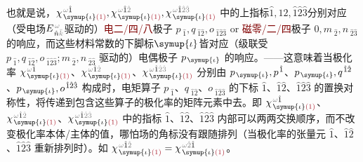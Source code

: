 也就是说，$\chi^{\;\! \mathcolor{gray}{\omega} \hat{1}}_{\;\! \symup{\iota} \textcolor{Maroon}{(1)}},\chi^{\;\! \mathcolor{gray}{\omega} \hat{1} \mathcolor{gray}{\hat{2}}}_{\;\! \symup{\iota} \textcolor{Maroon}{(1)}},\chi^{\;\! \mathcolor{gray}{\omega} \hat{1} \mathcolor{gray}{\hat{2} \hat{3}}}_{\;\! \symup{\iota} \textcolor{Maroon}{(1)}}$ 中的上指标$\hat{1},\hat{1} \hat{2},\hat{1} \hat{2} \hat{3}$分别对应（受电场$E^{\;\!\mathcolor{gray}{\omega}}_{\;\! \hat{n} \mathcolor{gray}{\bar{k}}}$驱动的）\textcolor{Maroon}{电二/四/八}极子 $p_{\;\! \hat{1}}, q_{\;\! \hat{1} \hat{2}}, o_{\;\! \hat{1} \hat{2} \hat{3}}$ or \textcolor{Maroon}{磁零/二/四}极子 $0, m_{\;\! \hat{2}}, n_{\;\! \hat{2} \hat{3}}$ 的响应，而这些材料常数的下脚标$\symup{\iota}$皆对应（级联受 $p_{\;\! \hat{1}}, q_{\;\! \hat{1} \hat{2}}, o_{\;\! \hat{1} \hat{2} \hat{3}}; m_{\;\! \hat{2}}, n_{\;\! \hat{2} \hat{3}}$ 驱动的）电偶极子 $p_{\;\! \symup{\iota}}$ 的响应。——这意味着当极化率 $\chi^{\;\! \mathcolor{gray}{\omega} \hat{1}}_{\;\! \symup{\iota} \textcolor{Maroon}{(1)}}$、$\chi^{\;\! \mathcolor{gray}{\omega} \hat{1} \mathcolor{gray}{\hat{2}}}_{\;\! \symup{\iota} \textcolor{Maroon}{(1)}}$、$\chi^{\;\! \mathcolor{gray}{\omega} \hat{1} \mathcolor{gray}{\hat{2} \hat{3}}}_{\;\! \symup{\iota} \textcolor{Maroon}{(1)}}$ 分别由 $p_{\;\! \symup{\iota}}, p^{\;\! \hat{1}}$、$p_{\;\! \symup{\iota}}, q^{\;\! \hat{1} \hat{2}}$、$p_{\;\! \symup{\iota}}, o^{\;\! \hat{1} \hat{2} \hat{3}}$ 构成时，电矩算子 $p_{\;\! \hat{1}}$、$ q_{\;\! \hat{1} \hat{2}}$、$ o_{\;\! \hat{1} \hat{2} \hat{3}}$ 的下标 $\hat{1}$、$\hat{1} \hat{2}$、$\hat{1} \hat{2} \hat{3}$ 的置换对称性，将传递到包含这些算子的极化率的矩阵元素中去。即 $\chi^{\;\! \mathcolor{gray}{\omega} \hat{1}}_{\;\! \symup{\iota} \textcolor{Maroon}{(1)}}$、$\chi^{\;\! \mathcolor{gray}{\omega} \hat{1} \mathcolor{gray}{\hat{2}}}_{\;\! \symup{\iota} \textcolor{Maroon}{(1)}}$、$\chi^{\;\! \mathcolor{gray}{\omega} \hat{1} \mathcolor{gray}{\hat{2} \hat{3}}}_{\;\! \symup{\iota} \textcolor{Maroon}{(1)}}$ 中的指标 $\hat{1}$、$\hat{1} \hat{2}$、$\hat{1} \hat{2} \hat{3}$ 内部可以两两交换顺序，而不改变极化率本体/主体的值，哪怕场的角标没有跟随排列（当极化率的张量元 $\hat{1}$、$\hat{1} \hat{2}$、$\hat{1} \hat{2} \hat{3}$ 重新排列时）。如 $\chi^{\;\! \mathcolor{gray}{\omega} \hat{1} \mathcolor{gray}{\hat{2}}}_{\;\! \symup{\iota} \textcolor{Maroon}{(1)}} = \chi^{\;\! \mathcolor{gray}{\omega} \mathcolor{gray}{\hat{2}} \hat{1}}_{\;\! \symup{\iota} \textcolor{Maroon}{(1)}}$。

